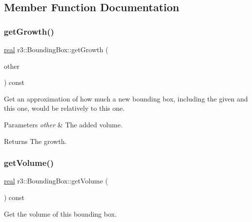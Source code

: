 \subsection{Member Function Documentation}
\mbox{\label{classr3_1_1_bounding_box_a21631e2fffeb995d3a9647489f936d13}} 
\subsubsection{\texorpdfstring{get\+Growth()}{getGrowth()}}
{\footnotesize\ttfamily \mbox{\hyperlink{namespacer3_ab2016b3e3f743fb735afce242f0dc1eb}{real}} r3\+::\+Bounding\+Box\+::get\+Growth (\begin{DoxyParamCaption}\item[{const \mbox{\hyperlink{classr3_1_1_bounding_box}{Bounding\+Box}} \&}]{other }\end{DoxyParamCaption}) const}



Get an approximation of how much a new bounding box, including the given and this one, would be relatively to this one. 


\begin{DoxyParams}{Parameters}
{\em other} & The added volume. \\
\hline
\end{DoxyParams}
\begin{DoxyReturn}{Returns}
The growth. 
\end{DoxyReturn}
\mbox{\label{classr3_1_1_bounding_box_a3e6a9b79373dde150d18d5d5df59a2f3}} 
\subsubsection{\texorpdfstring{get\+Volume()}{getVolume()}}
{\footnotesize\ttfamily \mbox{\hyperlink{namespacer3_ab2016b3e3f743fb735afce242f0dc1eb}{real}} r3\+::\+Bounding\+Box\+::get\+Volume (\begin{DoxyParamCaption}{ }\end{DoxyParamCaption}) const}



Get the volume of this bounding box. 

